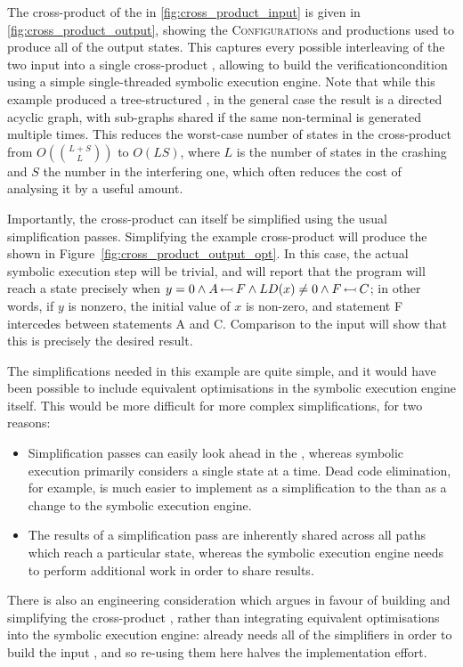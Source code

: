 The cross-product of the {\StateMachines} in
\autoref{fig:cross_product_input} is given in
\autoref{fig:cross_product_output}, showing the
\textsc{Configuration}s and productions used to produce all of the
output states.  This captures every possible interleaving of the two
input {\StateMachines} into a single cross-product {\StateMachine},
allowing {\technique} to build the \gls{verificationcondition} using a
simple single-threaded symbolic execution engine.  Note that while
this example produced a tree-structured {\StateMachine}, in the
general case the result is a directed acyclic graph, with sub-graphs
shared if the same non-terminal is generated multiple times.  This
reduces the worst-case number of states in the cross-product
{\StateMachine} from $O(\binom{L+S}{L})$ to $O(LS)$, where $L$ is the
number of states in the crashing {\StateMachine} and $S$ the number in
the interfering one, which often reduces the cost of analysing it by a
useful amount.

 Importantly, the cross-product {\StateMachine} can itself
be simplified using the usual {\StateMachine} simplification passes.
Simplifying the example cross-product {\StateMachine} will produce the
{\StateMachine} shown in Figure~\ref{fig:cross_product_output_opt}.
In this case, the actual symbolic execution step will be trivial, and
will report that the program will reach a {\stCrash} state precisely
when $y = 0 \wedge A\,{\leftarrowtail}\,F \wedge LD(x) \not= 0 \wedge
F\,{\leftarrowtail}\,C$; in other words, if $y$ is nonzero, the initial
value of $x$ is non-zero, and statement F intercedes between
statements A and C.  Comparison to the input {\StateMachines} will
show that this is precisely the desired result.

The simplifications needed in this example are quite simple, and it
would have been possible to include equivalent optimisations in the
symbolic execution engine itself.  This would be more difficult for
more complex simplifications, for two reasons:
\begin{itemize}
\item Simplification passes can easily look ahead in the
  {\StateMachine}, whereas symbolic execution primarily considers a
  single state at a time.  Dead code elimination, for example, is much
  easier to implement as a simplification to the {\StateMachine} than
  as a change to the symbolic execution engine.
\item The results of a simplification pass are inherently shared
  across all paths which reach a particular state, whereas the
  symbolic execution engine needs to perform additional work in order
  to share results.
\end{itemize}
There is also an engineering consideration which argues in favour of
building and simplifying the cross-product {\StateMachine}, rather
than integrating equivalent optimisations into the symbolic execution
engine: {\implementation} already needs all of the simplifiers in
order to build the input {\StateMachines}, and so re-using them here
halves the implementation effort.

